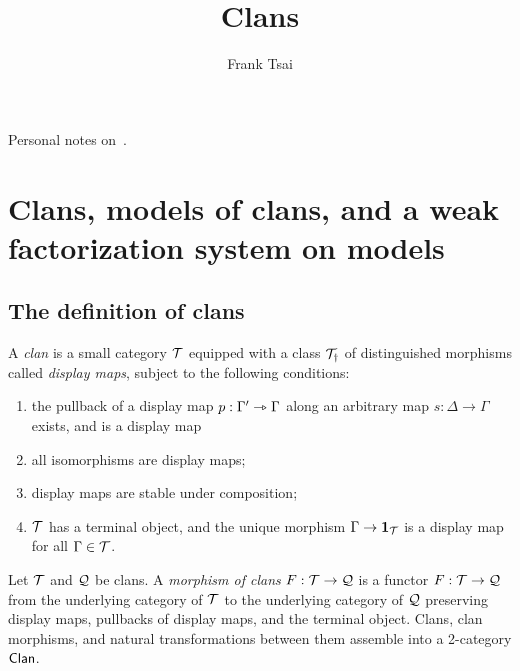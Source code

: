 \documentclass[a4paper]{article}
\title{Clans}
\author{Frank Tsai}
\begin{document}
\maketitle

Personal notes on~\cite{Frey25}.

\section{Clans, models of clans, and a weak factorization system on models}

\subsection{The definition of clans}
\begin{definition}
  A \emph{clan} is a small category $\mathcal{T}$ equipped with a class $\mathcal{T}_{\dag}$ of distinguished morphisms called \emph{display maps}, subject to the following conditions:
  \begin{enumerate}
  \item the pullback of a display map $p : \Gamma' \rightarrowtriangle \Gamma$ along an arbitrary map $s : \Delta \to \Gamma$ exists, and is a display map
    \begin{center}
    \end{center}
  \item all isomorphisms are display maps;
  \item display maps are stable under composition;
  \item $\mathcal{T}$ has a terminal object, and the unique morphism $\Gamma \to \mathbf{1}_{\mathcal{T}}$ is a display map for all $\Gamma \in \mathcal{T}$.
  \end{enumerate}
\end{definition}

\begin{definition}
  Let $\mathcal{T}$ and $\mathcal{Q}$ be clans.
  A \emph{morphism of clans} $F : \mathcal{T} \to \mathcal{Q}$ is a functor $F : \mathcal{T} \to \mathcal{Q}$ from the underlying category of $\mathcal{T}$ to the underlying category of $\mathcal{Q}$ preserving display maps, pullbacks of display maps, and the terminal object.
  Clans, clan morphisms, and natural transformations between them assemble into a 2-category $\mathsf{Clan}$.
\end{definition}
\end{document}
